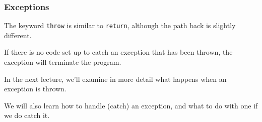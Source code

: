 \begin{frame}
\frametitle{Exceptions}

The keyword \texttt{throw} is similar to \texttt{return}, although the path back is slightly different.

If there is no code set up to \alert{catch} an exception that has been thrown, the exception will terminate the program.

In the next lecture, we'll examine in more detail what happens when an exception is thrown.

We will also learn how to handle (catch) an exception, and what to do with one if we do catch it.


\end{frame}



